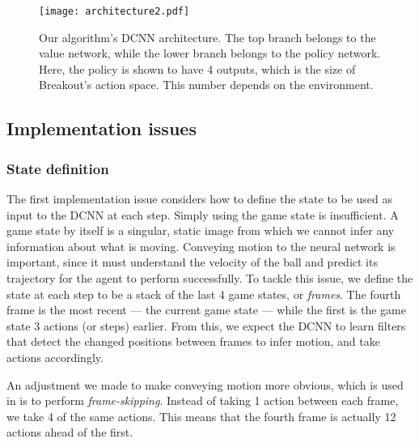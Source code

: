 \documentclass[12pt,a4paper]{article}
\begin{document}
\begin{figure}[ht]
    \centering
    \texttt{[image: architecture2.pdf]}
    \caption[]{Our algorithm's DCNN architecture\footnotemark. The top branch belongs to the value network, while the lower branch belongs to the policy network. Here, the policy is shown to have 4 outputs, which is the size of Breakout's action space. This number depends on the environment.}
\end{figure}

\subsection{Implementation issues}
\subsubsection{State definition}
The first implementation issue considers how to define the state to be used as input to the DCNN at each step. Simply using the game state is insufficient. A game state by itself is a singular, static image from which we cannot infer any information about what is moving. Conveying motion to the neural network is important, since it must understand the velocity of the ball and predict its trajectory for the agent to perform successfully. To tackle this issue, we define the state at each step to be a stack of the last 4 game states, or \emph{frames}. The fourth frame is the most recent --- the current game state --- while the first is the game state 3 actions (or steps) earlier. From this, we expect the DCNN to learn filters that detect the changed positions between frames to infer motion, and take actions accordingly.

An adjustment we made to make conveying motion more obvious, which is used in \cite{Mnih2015} is to perform \emph{frame-skipping}. Instead of taking 1 action between each frame, we take 4 of the same actions. This means that the fourth frame is actually 12 actions ahead of the first. 
\end{document}
